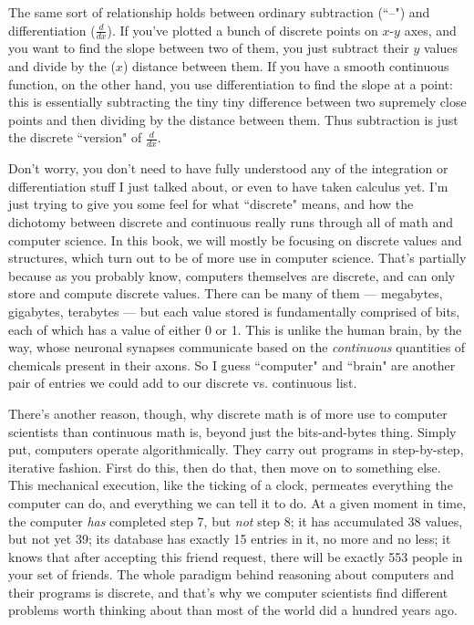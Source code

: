 The same sort of relationship holds between ordinary subtraction (``--")
and differentiation ($\frac{d}{dx}$). If you've plotted a bunch of discrete
points on $x$-$y$ axes, and you want to find the slope between two of them,
you just subtract their $y$ values and divide by the ($x$) distance between
them. If you have a smooth continuous function, on the other hand, you use
differentiation to find the slope at a point: this is essentially
subtracting the tiny tiny difference between two supremely close points and
then dividing by the distance between them. Thus subtraction is just the
discrete ``version" of $\frac{d}{dx}$.

Don't worry, you don't need to have fully understood any of the integration
or differentiation stuff I just talked about, or even to have taken
calculus yet. I'm just trying to give you some feel for what ``discrete"
means, and how the dichotomy between discrete and continuous really runs
through all of math and computer science. In this book, we will mostly be
focusing on discrete values and structures, which turn out to be of more
use in computer science.  That's partially because as you probably know,
computers themselves are discrete, and can only store and compute discrete
values. There can be many of them --- megabytes, gigabytes, terabytes ---
but each value stored is fundamentally comprised of bits, each of which has
a value of either 0 or 1. This is unlike the human brain, by the way, whose
neuronal synapses communicate based on the \textit{continuous} quantities
of chemicals present in their axons. So I guess ``computer" and ``brain"
are another pair of entries we could add to our discrete vs. continuous
list.

There's another reason, though, why discrete math is of more use to
computer scientists than continuous math is, beyond just the bits-and-bytes
thing. Simply put, computers operate algorithmically. They carry out
programs in step-by-step, iterative fashion. First do this, then do that,
then move on to something else. This mechanical execution, like the ticking
of a clock, permeates everything the computer can do, and everything we can
tell it to do. At a given moment in time, the computer \textit{has}
completed step 7, but \textit{not} step 8; it has accumulated 38 values,
but not yet 39; its database has exactly 15 entries in it, no more and no
less; it knows that after accepting this friend request, there will be
exactly 553 people in your set of friends. The whole paradigm behind
reasoning about computers and their programs is discrete, and that's why we
computer scientists find different problems worth thinking about than most
of the world did a hundred years ago.

